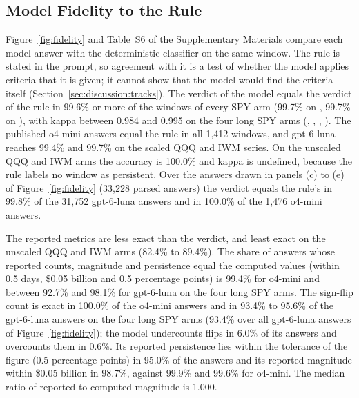 \subsection{Model Fidelity to the Rule}
\label{sec:results:fidelity}

Figure~\ref{fig:fidelity} and Table~S6 of the Supplementary Materials compare each model answer with the deterministic classifier on the same window. The rule is stated in the prompt, so agreement with it is a test of whether the model applies criteria that it is given; it cannot show that the model would find the criteria itself (Section~\ref{sec:discussion:tracks}).
The verdict of the model equals the verdict of the rule in 99.6\% or more of the windows of every SPY arm (99.7\% on , 99.7\% on ), with kappa between 0.984 and 0.995 on the four long SPY arms (, , , ). The published o4-mini answers equal the rule in all 1{,}412 windows, and gpt-6-luna reaches 99.4\% and 99.7\% on the scaled QQQ and IWM series. On the unscaled QQQ and IWM arms the accuracy is 100.0\% and kappa is undefined, because the rule labels no window as persistent. Over the answers drawn in panels (c) to (e) of Figure~\ref{fig:fidelity} (33{,}228 parsed answers) the verdict equals the rule's in 99.8\% of the 31{,}752 gpt-6-luna answers and in 100.0\% of the 1{,}476 o4-mini answers.

The reported metrics are less exact than the verdict, and least exact on the unscaled QQQ and IWM arms (82.4\% to 89.4\%). The share of answers whose reported counts, magnitude and persistence equal the computed values (within 0.5 days, \$0.05 billion and 0.5 percentage points) is 99.4\% for o4-mini and between 92.7\% and 98.1\% for gpt-6-luna on the four long SPY arms. The sign-flip count is exact in 100.0\% of the o4-mini answers and in 93.4\% to 95.6\% of the gpt-6-luna answers on the four long SPY arms (93.4\% over all gpt-6-luna answers of Figure~\ref{fig:fidelity}); the model undercounts flips in 6.0\% of its answers and overcounts them in 0.6\%. Its reported persistence lies within the tolerance of the figure (0.5 percentage points) in 95.0\% of the answers and its reported magnitude within \$0.05 billion in 98.7\%, against 99.9\% and 99.6\% for o4-mini. The median ratio of reported to computed magnitude is 1.000.

